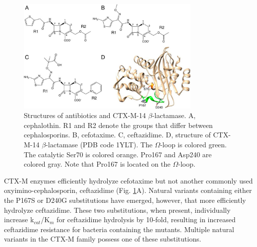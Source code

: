 \documentclass[../main.tex]{subfiles}
\begin{document}
        \begin{figure}[!htb] %
            \centering
            \includegraphics[width=3.5in]{ch2-fig2.jpg}
            \caption[Structures of antibiotics and CTX-M-14 $\beta$-lactamase.]
                {Structures of antibiotics and CTX-M-14 $\beta$-lactamase. A, cephalothin. R1 and R2 denote the groups that differ between cephalosporins. B, cefotaxime. C, ceftazidime. D, structure of CTX-M-14 $\beta$-lactamase (PDB code 1YLT). The $\Omega$-loop is colored green. The catalytic Ser70 is colored orange. Pro167 and Asp240 are colored gray. Note that Pro167 is located on the $\Omega$-loop.}
            \label{fig:ch2-fig2}
        \end{figure}

        CTX-M enzymes efficiently hydrolyze cefotaxime but not another commonly used oxyimino-cephalosporin, ceftazidime (Fig. \ref{fig:ch2-fig2}A). Natural variants containing either the P167S or D240G substitutions have emerged, however, that more efficiently hydrolyze ceftazidime\cite{dandrea_ctx-m-type_2013,bonnet_effect_2003,kimura_role_2004,canton_ctx-m_2012}. These two substitutions, when present, individually increase k$_{cat}$/K$_{m}$ for ceftazidime hydrolysis by 10-fold, resulting in increased ceftazidime resistance for bacteria containing the mutants\cite{chen_atomic_2005,patel_drug-resistant_2017}. Multiple natural variants in the CTX-M family possess one of these substitutions\cite{dandrea_ctx-m-type_2013}.
\end{document}
